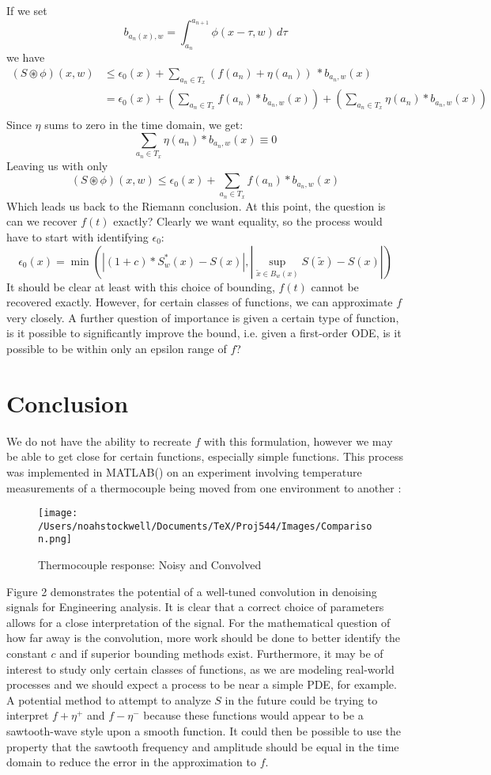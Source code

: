 \documentclass[11pt]{amsart}
\theoremstyle{definition}
\theoremstyle{remark}
\begin{document}
If we set 
\[
b_{{a_n}(x), w} = \int_{a_n}^{a_{n+1}} \phi(x-\tau, w)\,d\tau
\]
we have
\begin{align*}
(S\circledast\phi)(x, w) &\le \epsilon_0(x) +  \sum_{a_n\in T_x} \left(f\left(a_n\right) + \eta\left(a_n\right)\right)\ * b_{{a_n}, w}(x)\\
&= \epsilon_0(x) +  \left(\sum_{a_n\in T_x} f\left(a_n\right) * b_{{a_n}, w}(x)\right) + \left(\sum_{a_n\in T_x} \eta\left(a_n\right) * b_{{a_n}, w}(x)\right)\\
\end{align*}
Since $\eta$ sums to zero in the time domain, we get:
\[
\sum_{a_n\in T_x} \eta\left(a_n\right) * b_{{a_n}, w}(x) \equiv 0
\]
Leaving us with only
\[
(S\circledast\phi)(x, w) \le \epsilon_0(x) +  \sum_{a_n\in T_x} f\left(a_n\right) * b_{{a_n}, w}(x)
\]
Which leads us back to the Riemann conclusion. At this point, the question is can we recover $f(t)$ exactly? Clearly we want equality, so the process would have to start with identifying $\epsilon_0$:
\[
\epsilon_0(x) = \min\left(\left|(1+c)*S^*_{w}(x) - S(x)\right|, \left|\sup_{\tilde{x}\in B_w(x)}S(\tilde{x}) - S(x)\right|\right)
\]
It should be clear at least with this choice of bounding, $f(t)$ cannot be recovered exactly. However, for certain classes of functions, we can approximate $f$ very closely. A further question of importance is given a certain type of function, is it possible to significantly improve the bound, i.e. given a first-order ODE, is it possible to be within only an epsilon range of $f$? 
\newpage
\section{Conclusion}
We do not have the ability to recreate $f$ with this formulation, however we may be able to get close for certain functions, especially simple functions. This process was implemented in MATLAB(\texttrademark) on an experiment involving temperature measurements of a thermocouple being moved from one environment to another \cite{engr_132}:
\begin{figure}[H]
	\centering
	\texttt{[image: /Users/noahstockwell/Documents/TeX/Proj544/Images/Comparison.png]}
	\caption{Thermocouple response: Noisy and Convolved}
\end{figure}
Figure 2 demonstrates the potential of a well-tuned convolution in denoising signals for Engineering analysis. It is clear that a correct choice of parameters allows for a close interpretation of the signal. For the mathematical question of how far away is the convolution, more work should be done to better identify the constant $c$ and if superior bounding methods exist. Furthermore, it may be of interest to study only certain classes of functions, as we are modeling real-world processes and we should expect a process to be near a simple PDE, for example. \\
A potential method to attempt to analyze $S$ in the future could be trying to interpret $f+\eta^+$ and $f-\eta^-$ because these functions would appear to be a sawtooth-wave style upon a smooth function. It could then be possible to use the property that the sawtooth frequency and amplitude should be equal in the time domain to reduce the error in the approximation to $f$.
\newpage


\end{document}
